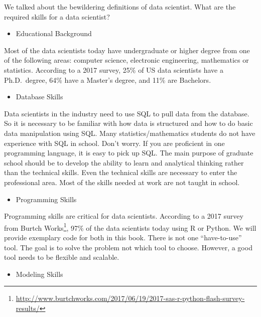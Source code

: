 \documentclass[12pt,]{krantz}
\providecommand{\tightlist}{%
  \setlength{\itemsep}{0pt}\setlength{\parskip}{0pt}}
\renewcommand{\href}[2]{#2\footnote{\url{#1}}}
\theoremstyle{definition}
\theoremstyle{definition}
\theoremstyle{remark}
\begin{document}
We talked about the bewildering definitions of data scientist. What are
the required skills for a data scientist?

\begin{itemize}
\tightlist
\item
  Educational Background
\end{itemize}

Most of the data scientists today have undergraduate or higher degree
from one of the following areas: computer science, electronic
engineering, mathematics or statistics. According to a 2017 survey, 25\%
of US data scientists have a Ph.D.~degree, 64\% have a Master's degree,
and 11\% are Bachelors.

\begin{itemize}
\tightlist
\item
  Database Skills
\end{itemize}

Data scientists in the industry need to use SQL to pull data from the
database. So it is necessary to be familiar with how data is structured
and how to do basic data manipulation using SQL. Many
statistics/mathematics students do not have experience with SQL in
school. Don't worry. If you are proficient in one programming language,
it is easy to pick up SQL. The main purpose of graduate school should be
to develop the ability to learn and analytical thinking rather than the
technical skills. Even the technical skills are necessary to enter the
professional area. Most of the skills needed at work are not taught in
school.

\begin{itemize}
\tightlist
\item
  Programming Skills
\end{itemize}

Programming skills are critical for data scientists. According to a 2017
survey from
\href{http://www.burtchworks.com/2017/06/19/2017-sas-r-python-flash-survey-results/}{Burtch
Works}, 97\% of the data scientists today using R or Python. We will
provide exemplary code for both in this book. There is not one
``have-to-use'' tool. The goal is to solve the problem not which tool to
choose. However, a good tool needs to be flexible and scalable.

\begin{itemize}
\tightlist
\item
  Modeling Skills
\end{itemize}
\end{document}
